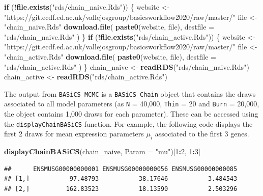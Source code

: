 \documentclass[9pt,a4paper,]{extarticle}
\newenvironment{Shaded}{\begin{snugshade}}{\end{snugshade}}
\newcommand{\ControlFlowTok}[1]{\textcolor[rgb]{0.13,0.29,0.53}{\textbf{#1}}}
\newcommand{\DataTypeTok}[1]{\textcolor[rgb]{0.13,0.29,0.53}{#1}}
\newcommand{\DecValTok}[1]{\textcolor[rgb]{0.00,0.00,0.81}{#1}}
\newcommand{\KeywordTok}[1]{\textcolor[rgb]{0.13,0.29,0.53}{\textbf{#1}}}
\newcommand{\NormalTok}[1]{#1}
\newcommand{\OperatorTok}[1]{\textcolor[rgb]{0.81,0.36,0.00}{\textbf{#1}}}
\newcommand{\StringTok}[1]{\textcolor[rgb]{0.31,0.60,0.02}{#1}}
\begin{document}
\begin{Shaded}
\begin{Highlighting}[]
\ControlFlowTok{if}\NormalTok{ (}\OperatorTok{!}\KeywordTok{file.exists}\NormalTok{(}\StringTok{"rds/chain_naive.Rds"}\NormalTok{)) \{}
\NormalTok{  website <-}\StringTok{ "https://git.ecdf.ed.ac.uk/vallejosgroup/basicsworkflow2020/raw/master/"}
\NormalTok{  file <-}\StringTok{ "chain_naive.Rds"}
  \KeywordTok{download.file}\NormalTok{(}
    \KeywordTok{paste0}\NormalTok{(website, file),}
    \DataTypeTok{destfile =} \StringTok{"rds/chain_naive.Rds"}
\NormalTok{  )  }
\NormalTok{\}}
\ControlFlowTok{if}\NormalTok{ (}\OperatorTok{!}\KeywordTok{file.exists}\NormalTok{(}\StringTok{"rds/chain_active.Rds"}\NormalTok{)) \{}
\NormalTok{  website <-}\StringTok{ "https://git.ecdf.ed.ac.uk/vallejosgroup/basicsworkflow2020/raw/master/"}
\NormalTok{  file <-}\StringTok{ "chain_active.Rds"}
  \KeywordTok{download.file}\NormalTok{(}
    \KeywordTok{paste0}\NormalTok{(website, file),}
    \DataTypeTok{destfile =} \StringTok{"rds/chain_active.Rds"}
\NormalTok{  )  }
\NormalTok{\}}
\NormalTok{chain_naive <-}\StringTok{ }\KeywordTok{readRDS}\NormalTok{(}\StringTok{"rds/chain_naive.Rds"}\NormalTok{)}
\NormalTok{chain_active <-}\StringTok{ }\KeywordTok{readRDS}\NormalTok{(}\StringTok{"rds/chain_active.Rds"}\NormalTok{)}
\end{Highlighting}
\end{Shaded}

The output from \texttt{BASiCS\_MCMC} is a \texttt{BASiCS\_Chain} object that contains the
draws associated to all model parameters (as \texttt{N} = 40,000, \texttt{Thin} = 20 and
\texttt{Burn} = 20,000, the object contains 1,000 draws for each parameter).
These can be accessed using the \texttt{displayChainBASiCS} function.
For example, the following code displays the first 2 draws for mean
expression parameters \(\mu_i\) associated to the first 3 genes.

\begin{Shaded}
\begin{Highlighting}[]
\KeywordTok{displayChainBASiCS}\NormalTok{(chain_naive, }\DataTypeTok{Param =} \StringTok{"mu"}\NormalTok{)[}\DecValTok{1}\OperatorTok{:}\DecValTok{2}\NormalTok{, }\DecValTok{1}\OperatorTok{:}\DecValTok{3}\NormalTok{]}
\end{Highlighting}
\end{Shaded}

\begin{verbatim}
##      ENSMUSG00000000001 ENSMUSG00000000056 ENSMUSG00000000085
## [1,]           97.48793           38.17646           3.484543
## [2,]          162.83523           18.13590           2.503296
\end{verbatim}
\end{document}
